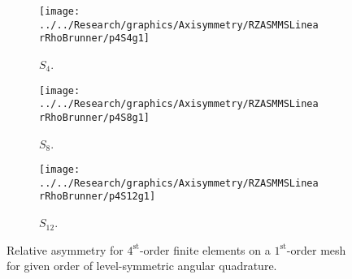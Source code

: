 \documentclass[12pt]{article}
\begin{document}
\begin{sidewaysfigure}[!htb]
\centering
\begin{subfigure}{0.33\textwidth}
\texttt{[image: ../../Research/graphics/Axisymmetry/RZASMMSLinearRhoBrunner/p4S4g1]}
\caption{$S_4$.}
\end{subfigure}%
\begin{subfigure}{0.33\textwidth}
\texttt{[image: ../../Research/graphics/Axisymmetry/RZASMMSLinearRhoBrunner/p4S8g1]}
\caption{$S_8$.}
\end{subfigure}%
\begin{subfigure}{0.33\textwidth}
\texttt{[image: ../../Research/graphics/Axisymmetry/RZASMMSLinearRhoBrunner/p4S12g1]}
\caption{$S_{12}$.}
\end{subfigure}
\caption{Relative asymmetry for $4^\text{st}$-order finite elements on a $1^\text{st}$-order mesh for given order of level-symmetric angular quadrature.}
\label{fig:RZASMMSLinearRhoBrunnerp4g1}
\end{sidewaysfigure}
\end{document}
